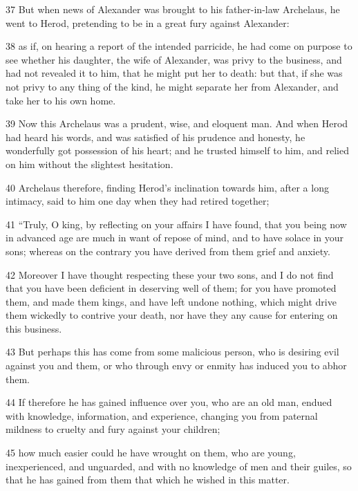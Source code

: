 \par 37 But when news of Alexander was brought to his father-in-law Archelaus, he went to Herod, pretending to be in a great fury against Alexander: 


\par 38 as if, on hearing a report of the intended parricide, he had come on purpose to see whether his daughter, the wife of Alexander, was privy to the business, and had not revealed it to him, that he might put her to death: but that, if she was not privy to any thing of the kind, he might separate her from Alexander, and take her to his own home. 

\par 39 Now this Archelaus was a prudent, wise, and eloquent man. And when Herod had heard his words, and was satisfied of his prudence and honesty, he wonderfully got possession of his heart; and he trusted himself to him, and relied on him without the slightest hesitation. 

\par 40 Archelaus therefore, finding Herod’s inclination towards him, after a long intimacy, said to him one day when they had retired together; 

\par 41 “Truly, O king, by reflecting on your affairs I have found, that you being now in advanced age are much in want of repose of mind, and to have solace in your sons; whereas on the contrary you have derived from them grief and anxiety. 

\par 42 Moreover I have thought respecting these your two sons, and I do not find that you have been deficient in deserving well of them; for you have promoted them, and made them kings, and have left undone nothing, which might drive them wickedly to contrive your death, nor have they any cause for entering on this business. 

\par 43 But perhaps this has come from some malicious person, who is desiring evil against you and them, or who through envy or enmity has induced you to abhor them. 

\par 44 If therefore he has gained influence over you, who are an old man, endued with knowledge, information, and experience, changing you from paternal mildness to cruelty and fury against your children; 

\par 45 how much easier could he have wrought on them, who are young, inexperienced, and unguarded, and with no knowledge of men and their guiles, so that he has gained from them that which he wished in this matter. 

